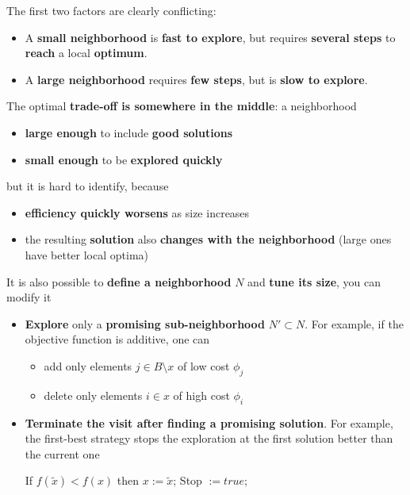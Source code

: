 \documentclass[11pt]{article}
\begin{document}
	The first two factors are clearly conflicting:
	\begin{itemize}
		\item A \textbf{small neighborhood} is \textbf{fast to explore}, but requires \textbf{several steps} to \textbf{reach} a local \textbf{optimum}.\\
		
		\item A \textbf{large neighborhood} requires \textbf{few steps}, but is \textbf{slow to explore}.\\
	\end{itemize}
	
	The optimal \textbf{trade-off is somewhere in the middle}: a neighborhood
	\begin{itemize}
		\item \textbf{large enough} to include \textbf{good solutions}
		\item \textbf{small enough} to be \textbf{explored quickly}
	\end{itemize}
	
	but it is hard to identify, because
	\begin{itemize}
		\item \textbf{efficiency quickly worsens} as size increases
		\item the resulting \textbf{solution} also \textbf{changes with the neighborhood} (large ones have better local optima)
	\end{itemize}
	
	\newpage
	
	It is also possible to \textbf{define a neighborhood} $N$ and \textbf{tune its size}, you can modify it
	\begin{itemize}
		\item \textbf{Explore} only a \textbf{promising sub-neighborhood} $N′ ⊂ N$. For example, if the objective function is additive, one can
		\begin{itemize}
			\item add only elements $j \in B \setminus x$ of low cost $\phi_j$
			\item delete only elements $i \in x$ of high cost $\phi_i$
		\end{itemize}
		\nn
		
		\item \textbf{Terminate the visit after finding a promising solution}. For example, the first-best strategy stops the exploration at the first solution better than the current one
		\begin{center}
			If $f (\tilde{x}) < f (x)$ then $x := \tilde{x}$; Stop $:= true$;
		\end{center}
		\nn
	\end{itemize}
	
\end{document}

